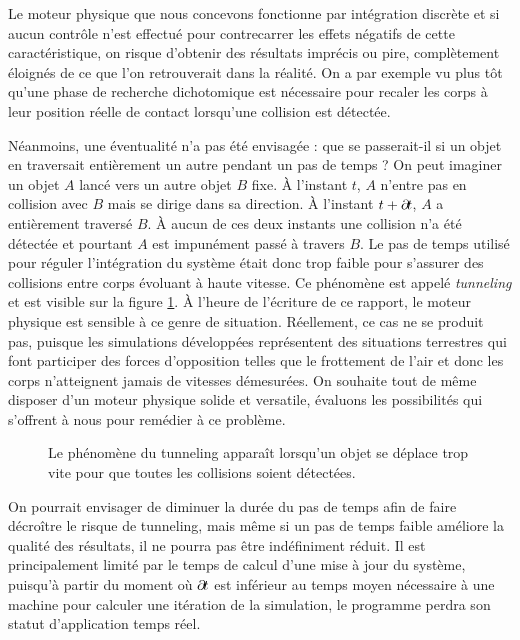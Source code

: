 Le moteur physique que nous concevons fonctionne par intégration
discrète et si aucun contrôle n'est effectué pour contrecarrer les
effets négatifs de cette caractéristique, on risque d'obtenir des
résultats imprécis ou pire, complètement éloignés de ce que l'on
retrouverait dans la réalité. On a par exemple vu plus tôt qu'une
phase de recherche dichotomique est nécessaire pour recaler les corps
à leur position réelle de contact lorsqu'une collision est détectée.

Néanmoins, une éventualité n'a pas été envisagée : que se passerait-il
si un objet en traversait entièrement un autre pendant un pas de temps
? On peut imaginer un objet $A$ lancé vers un autre objet $B$
fixe. \`A l'instant $t$, $A$ n'entre pas en collision avec $B$ mais se
dirige dans sa direction. \`A l'instant $t + \partial \! t$, $A$ a
entièrement traversé $B$. \`A aucun de ces deux instants une collision
n'a été détectée et pourtant $A$ est impunément passé à travers
$B$. Le pas de temps utilisé pour réguler l'intégration du système
était donc trop faible pour s'assurer des collisions entre corps
évoluant à haute vitesse. Ce phénomène est appelé \textit{tunneling}
et est visible sur la figure \ref{tunneling1}. \`A l'heure de
l'écriture de ce rapport, le moteur physique est sensible à ce genre
de situation. Réellement, ce cas ne se produit pas, puisque les
simulations développées représentent des situations terrestres qui
font participer des forces d'opposition telles que le frottement de
l'air et donc les corps n'atteignent jamais de vitesses démesurées. On
souhaite tout de même disposer d'un moteur physique solide et
versatile, évaluons les possibilités qui s'offrent à nous pour
remédier à ce problème.

\begin{figure}
  \centering
  
  \caption{Le phénomène du tunneling apparaît lorsqu'un objet se déplace trop
    vite pour que toutes les collisions soient détectées.}
  \label{tunneling1}
\end{figure}

On pourrait envisager de diminuer la durée du pas de temps afin de
faire décroître le risque de tunneling, mais même si un pas de temps
faible améliore la qualité des résultats, il ne pourra pas être
indéfiniment réduit. Il est principalement limité par le temps de
calcul d'une mise à jour du système, puisqu'à partir du moment o\`u
$\partial \! t$ est inférieur au temps moyen nécessaire à une machine pour
calculer une itération de la simulation, le programme perdra son
statut d'application temps réel.

